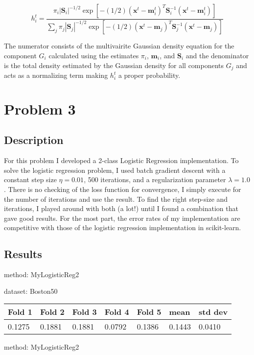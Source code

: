 \documentclass{article}
\begin{document}
\begin{equation}
h_i^t = \frac{ \pi_i|\mathbf{S}_i|^{-1/2} \exp [ - (1/2) (\mathbf{x}^t - \mathbf{m}_i^t)^T \mathbf{S}_i^{-1} (\mathbf{x}^t - \mathbf{m}_i^t) ] }{ \sum_j \pi_j |\mathbf{S}_j|^{-1/2} \exp[ -(1/2) (\mathbf{x}^t - \mathbf{m}_j)^T \mathbf{S}_j^{-1} (\mathbf{x}^t - \mathbf{m}_j) ] }
\end{equation}

The numerator consists of the multivairite Gaussian density equation for the component $G_i$ calculated using the estimates $\pi_i$, $\mathbf{m}_i$, and $\mathbf{S}_i$ and the denominator is the total density estimated by the Gaussian density for all components $G_j$ and acts as a normalizing term making $h_i^t$ a proper probability.


\section{Problem 3}

\subsection{Description}

For this problem I developed a 2-class Logistic Regression implementation.  To solve the logistic regression problem, I used batch gradient descent with a constant step size $\eta = 0.01$, 500 iterations, and a regularization parameter $\lambda = 1.0$.  There is no checking of the loss function for convergence, I simply execute for the number of iterations and use the result.  To find the right step-size and iterations, I played around with both (a lot!) until I found a combination that gave good results.  For the most part, the error rates of my implementation are competitive with those of the logistic regression implementation in scikit-learn.

\subsection{Results}

\hfill \break

\noindent method: MyLogisticReg2

\noindent dataset: Boston50

\begin{center}
	\begin{tabular}  { | l | l | l | l | l | l | l | }
	\hline
	Fold 1 & Fold 2 & Fold 3 & Fold 4 & Fold 5 & mean & std dev\\ \hline
	0.1275 & 0.1881 & 0.1881 & 0.0792 & 0.1386 & 0.1443 & 0.0410\\
	\hline
	\end{tabular}
\end{center}
\noindent method: MyLogisticReg2
\end{document}
